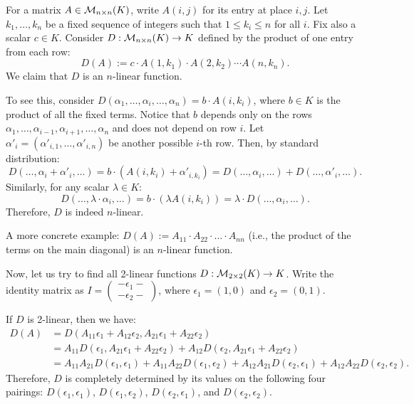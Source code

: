 \begin{example}\label{ex:n_linear_product}
  For a matrix $A \in \mathcal{M}_{n \times n}(K)$, write $A(i,j)$ for its entry at place $i,j$. Let $k_1, \dots, k_n$ be a fixed sequence of integers such that $1 \le k_i \le n$ for all $i$. Fix also a scalar $c \in K$. Consider $D : \mathcal{M}_{n \times n}(K) \to K$ defined by the product of one entry from each row:
  \[
  D(A) := c \cdot A(1, k_1) \cdot A(2, k_2) \cdots A(n, k_n).
  \]
  We claim that $D$ is an $n$-linear function.

  To see this, consider $D(\alpha_1, \dots, \alpha_i, \dots, \alpha_n) = b \cdot A(i, k_i)$, where $b \in K$ is the product of all the fixed terms. Notice that $b$ depends only on the rows $\alpha_1, \dots, \alpha_{i-1}, \alpha_{i+1}, \dots, \alpha_n$ and does not depend on row $i$.
  Let $\alpha'_i = (\alpha'_{i,1}, \dots, \alpha'_{i,n})$ be another possible $i$-th row. Then, by standard distribution:
  \[
  D(\dots, \alpha_i + \alpha'_i, \dots) = b \cdot (A(i, k_i) + \alpha'_{i, k_i}) = D(\dots, \alpha_i, \dots) + D(\dots, \alpha'_i, \dots).
  \]
  Similarly, for any scalar $\lambda \in K$:
  \[
  D(\dots, \lambda \cdot \alpha_i, \dots) = b \cdot (\lambda A(i, k_i)) = \lambda \cdot D(\dots, \alpha_i, \dots).
  \]
  Therefore, $D$ is indeed $n$-linear.
\end{example}

\begin{example}\label{ex:diagonal_product}
  A more concrete example: $D(A) := A_{11} \cdot A_{22} \cdot \dots \cdot A_{nn}$ (i.e., the product of the terms on the main diagonal) is an $n$-linear function.
\end{example}

Now, let us try to find all 2-linear functions $D: \mathcal{M}_{2 \times 2}(K) \to K$. Write the identity matrix as $I = \left(\begin{smallmatrix} -\epsilon_1- \\ -\epsilon_2- \end{smallmatrix}\right)$, where $\epsilon_1 = (1, 0)$ and $\epsilon_2 = (0, 1)$.

If $D$ is 2-linear, then we have:
\begin{align*}
  D(A) &= D(A_{11}\epsilon_1 + A_{12}\epsilon_2, A_{21}\epsilon_1 + A_{22}\epsilon_2) \\
  &= A_{11} D(\epsilon_1, A_{21}\epsilon_1 + A_{22}\epsilon_2) + A_{12} D(\epsilon_2, A_{21}\epsilon_1 + A_{22}\epsilon_2) \\
  &= A_{11}A_{21}D(\epsilon_1, \epsilon_1) + A_{11}A_{22}D(\epsilon_1, \epsilon_2) + A_{12}A_{21}D(\epsilon_2, \epsilon_1) + A_{12}A_{22}D(\epsilon_2, \epsilon_2).
\end{align*}
Therefore, $D$ is completely determined by its values on the following four pairings: $D(\epsilon_1, \epsilon_1)$, $D(\epsilon_1, \epsilon_2)$, $D(\epsilon_2, \epsilon_1)$, and $D(\epsilon_2, \epsilon_2)$.

